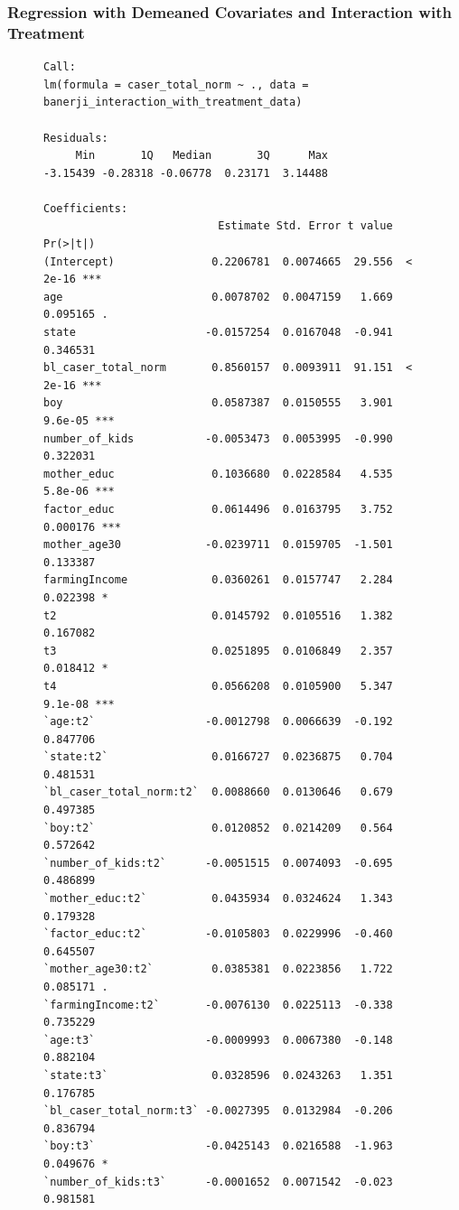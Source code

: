 \documentclass{article}
\begin{document}
\subsubsection*{Regression with Demeaned Covariates and Interaction with Treatment}
\begin{figure}[H]
\begin{lstlisting}[style=RstyleComment, caption=Regression with Demeaned Covariates and Interaction with Treatment]
Call:
lm(formula = caser_total_norm ~ ., data = banerji_interaction_with_treatment_data)

Residuals:
     Min       1Q   Median       3Q      Max 
-3.15439 -0.28318 -0.06778  0.23171  3.14488 

Coefficients:
                           Estimate Std. Error t value Pr(>|t|)    
(Intercept)               0.2206781  0.0074665  29.556  < 2e-16 ***
age                       0.0078702  0.0047159   1.669 0.095165 .  
state                    -0.0157254  0.0167048  -0.941 0.346531    
bl_caser_total_norm       0.8560157  0.0093911  91.151  < 2e-16 ***
boy                       0.0587387  0.0150555   3.901  9.6e-05 ***
number_of_kids           -0.0053473  0.0053995  -0.990 0.322031    
mother_educ               0.1036680  0.0228584   4.535  5.8e-06 ***
factor_educ               0.0614496  0.0163795   3.752 0.000176 ***
mother_age30             -0.0239711  0.0159705  -1.501 0.133387    
farmingIncome             0.0360261  0.0157747   2.284 0.022398 *  
t2                        0.0145792  0.0105516   1.382 0.167082    
t3                        0.0251895  0.0106849   2.357 0.018412 *  
t4                        0.0566208  0.0105900   5.347  9.1e-08 ***
`age:t2`                 -0.0012798  0.0066639  -0.192 0.847706    
`state:t2`                0.0166727  0.0236875   0.704 0.481531    
`bl_caser_total_norm:t2`  0.0088660  0.0130646   0.679 0.497385    
`boy:t2`                  0.0120852  0.0214209   0.564 0.572642    
`number_of_kids:t2`      -0.0051515  0.0074093  -0.695 0.486899    
`mother_educ:t2`          0.0435934  0.0324624   1.343 0.179328    
`factor_educ:t2`         -0.0105803  0.0229996  -0.460 0.645507    
`mother_age30:t2`         0.0385381  0.0223856   1.722 0.085171 .  
`farmingIncome:t2`       -0.0076130  0.0225113  -0.338 0.735229    
`age:t3`                 -0.0009993  0.0067380  -0.148 0.882104    
`state:t3`                0.0328596  0.0243263   1.351 0.176785    
`bl_caser_total_norm:t3` -0.0027395  0.0132984  -0.206 0.836794    
`boy:t3`                 -0.0425143  0.0216588  -1.963 0.049676 *  
`number_of_kids:t3`      -0.0001652  0.0071542  -0.023 0.981581    

\end{lstlisting}
\end{figure}
\end{document}
